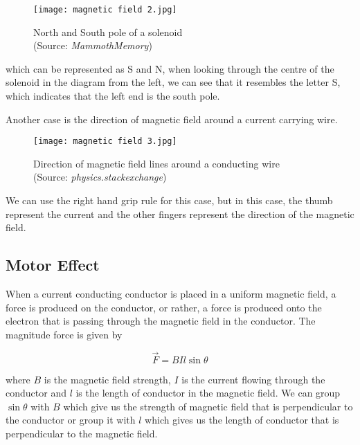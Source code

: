 \documentclass{article}
\begin{document}
\begin{figure}[H]
    \centering
    \captionsetup{justification=centering,margin=2cm}
    \texttt{[image: magnetic field 2.jpg]}
    \caption*{North and South pole of a solenoid \\ (Source: \textit{MammothMemory})}
\end{figure}

which can be represented as S and N, when looking through the centre of the solenoid in the diagram from the left, we can see that it resembles the letter S, which indicates that the left end is the south pole.

Another case is the direction of magnetic field around a current carrying wire.

\begin{figure}[H]
    \centering
    \captionsetup{justification=centering,margin=2cm}
    \texttt{[image: magnetic field 3.jpg]}
    \caption*{Direction of magnetic field lines around a conducting wire \\ (Source: \textit{physics.stackexchange})}
\end{figure}

We can use the right hand grip rule for this case, but in this case, the thumb represent the current and the other fingers represent the direction of the magnetic field.


 \subsection{Motor Effect}

When a current conducting conductor is placed in a uniform magnetic field, a force is produced on the conductor, or rather, a force is produced onto the electron that is passing through the magnetic field in the conductor. The magnitude force is given by 

\begin{equation}
\vec{F}=BIl\sin\theta
\end{equation}

where $B$ is the magnetic field strength, $I$ is the current flowing through the conductor and $l$ is the length of conductor in the magnetic field. We can group $\sin \theta $ with $B$ which give us the strength of magnetic field that is perpendicular to the conductor or group it with $l$ which gives us the length of conductor that is perpendicular to the magnetic field.
\end{document}
